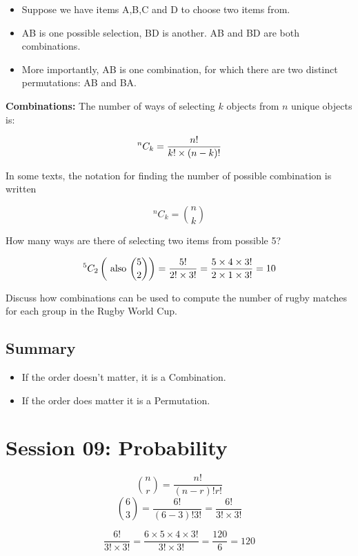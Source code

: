 \documentclass[]{report}
\begin{document}
{	\begin{itemize}
		\item Suppose we have items A,B,C and D to choose two items from.
		\item AB is one possible selection, BD is another. AB and BD are both combinations.
		\item More importantly, AB is one combination, for which there are two distinct permutations: AB and BA.
	\end{itemize}

	
	\textbf{Combinations: }
	The number of ways of selecting $k$ objects from $n$ unique objects is:
	
	\[ ^n C_k = {n!  \over k! \times (n-k)!} \]
	
	In some texts, the notation for finding the number of possible combination is written
	
	\[ ^n C_k =  {n \choose k} \]
	

	How many ways are there of selecting two items from possible 5?
	
	\[ ^5 C_2   \left( \mbox{ also }  {5 \choose 2}  \right) =  {5!  \over 2! \times 3!} =  {5 \times 4 \times 3!  \over 2 \times 1 \times 3!} = 10  \]
	
	Discuss how combinations can be used to compute the number of rugby matches for each group in the Rugby World Cup.
	

\subsection*{Summary}
\begin{itemize}
	\item If the order doesn't matter, it is a Combination.
	\item If the order does matter it is a Permutation.
\end{itemize}


	\section*{Session 09: Probability}


\begin{framed}
	
	\[ {n \choose r} = \frac{n!}{(n-r)! r!} \]
	\smallskip
	\[ {6 \choose 3} = \frac{6!}{(6-3)! 3!} = \frac{6!}{3! \times 3!}\]
	
	\smallskip
	\[ \frac{6!}{3! \times 3!} = \frac{6 \times 5 \times 4 \times 3!}{3! \times 3!} = \frac{120}{6} = 120\]
	\smallskip
\end{framed}

}
\end{document}
